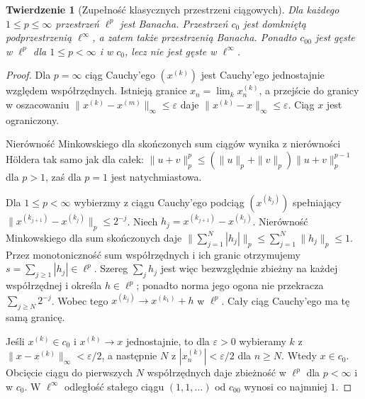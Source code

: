 \documentclass[11pt,a4paper]{article}
\numberwithin{equation}{section}
\theoremstyle{plain}
\newtheorem{twierdzenie}{Twierdzenie}[section]
\theoremstyle{definition}
\theoremstyle{remark}
\begin{document}
\begin{twierdzenie}[Zupełność klasycznych przestrzeni ciągowych]
\label{thm:seq-banach12}
Dla każdego $1\le p\le\infty$ przestrzeń $\ell^p$ jest Banacha.
Przestrzeń $c_0$ jest domkniętą podprzestrzenią $\ell^\infty$,
a zatem także przestrzenią Banacha. Ponadto $c_{00}$ jest gęste
w $\ell^p$ dla $1\le p<\infty$ i w $c_0$, lecz nie jest gęste
w $\ell^\infty$.
\end{twierdzenie}
\begin{proof}
Dla $p=\infty$ ciąg Cauchy'ego $(x^{(k)})$ jest Cauchy'ego
jednostajnie względem współrzędnych. Istnieją granice
$x_n=\lim_kx_n^{(k)}$, a przejście do granicy w oszacowaniu
$\|x^{(k)}-x^{(m)}\|_\infty\le\varepsilon$ daje
$\|x^{(k)}-x\|_\infty\le\varepsilon$. Ciąg $x$ jest ograniczony.

Nierówność Minkowskiego dla skończonych sum ciągów
wynika z nierówności H\"oldera tak samo jak dla całek:
$\|u+v\|_p^p\le(\|u\|_p+\|v\|_p)\|u+v\|_p^{p-1}$
dla $p>1$, zaś dla $p=1$ jest natychmiastowa.

Dla $1\le p<\infty$ wybierzmy z ciągu Cauchy'ego
podciąg $(x^{(k_j)})$ spełniający
$\|x^{(k_{j+1})}-x^{(k_j)}\|_p\le2^{-j}$.
Niech $h_j=x^{(k_{j+1})}-x^{(k_j)}$.
Nierówność Minkowskiego dla sum skończonych daje
$\|\sum_{j=1}^N|h_j|\|_p\le\sum_{j=1}^N\|h_j\|_p\le1$.
Przez monotoniczność sum współrzędnych i ich granic
otrzymujemy $s=\sum_{j\ge1}|h_j|\in\ell^p$.
Szereg $\sum_jh_j$ jest więc bezwzględnie zbieżny
na każdej współrzędnej i określa $h\in\ell^p$;
ponadto norma jego ogona nie przekracza $\sum_{j\ge N}2^{-j}$.
Wobec tego $x^{(k_j)}\to x^{(k_1)}+h$ w $\ell^p$.
Cały ciąg Cauchy'ego ma tę samą granicę.

Jeśli $x^{(k)}\in c_0$ i $x^{(k)}\to x$ jednostajnie,
to dla $\varepsilon>0$ wybieramy $k$ z
$\|x-x^{(k)}\|_\infty<\varepsilon/2$, a następnie $N$
z $|x_n^{(k)}|<\varepsilon/2$ dla $n\ge N$.
Wtedy $x\in c_0$. Obcięcie ciągu do pierwszych $N$
współrzędnych daje zbieżność w $\ell^p$ dla $p<\infty$
i w $c_0$. W $\ell^\infty$ odległość stałego ciągu
$(1,1,\ldots)$ od $c_{00}$ wynosi co najmniej $1$.
\end{proof}
\end{document}
